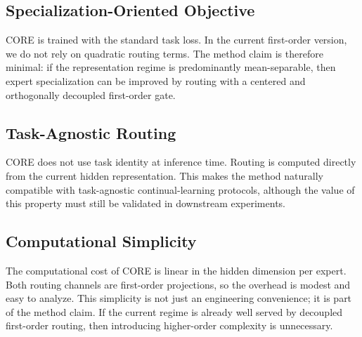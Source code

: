 \subsection{Specialization-Oriented Objective}
CORE is trained with the standard task loss. In the current first-order version, we do not rely on quadratic routing terms. The method claim is therefore minimal: if the representation regime is predominantly mean-separable, then expert specialization can be improved by routing with a centered and orthogonally decoupled first-order gate.

\subsection{Task-Agnostic Routing}
CORE does not use task identity at inference time. Routing is computed directly from the current hidden representation. This makes the method naturally compatible with task-agnostic continual-learning protocols, although the value of this property must still be validated in downstream experiments.

\subsection{Computational Simplicity}
The computational cost of CORE is linear in the hidden dimension per expert. Both routing channels are first-order projections, so the overhead is modest and easy to analyze. This simplicity is not just an engineering convenience; it is part of the method claim. If the current regime is already well served by decoupled first-order routing, then introducing higher-order complexity is unnecessary.
